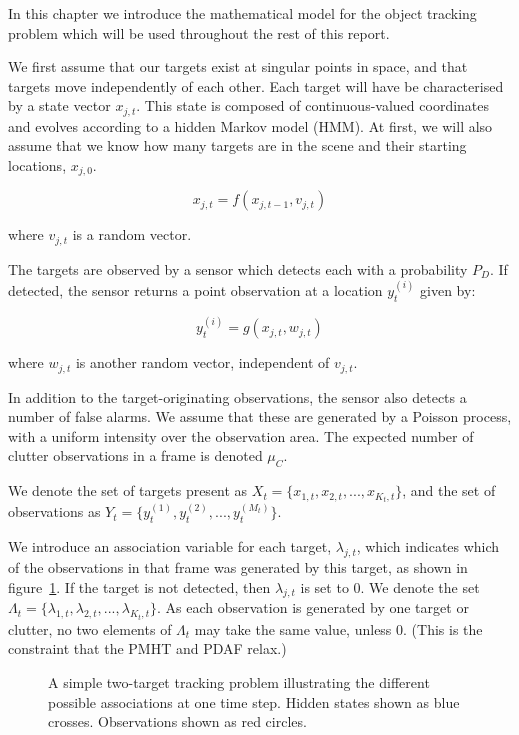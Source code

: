 In this chapter we introduce the mathematical model for the object tracking problem which will be used throughout the rest of this report.

We first assume that our targets exist at singular points in space, and that targets move independently of each other. Each target will have be characterised by a state vector $x_{j,t}$. This state is composed of continuous-valued coordinates and evolves according to a hidden Markov model (HMM). At first, we will also assume that we know how many targets are in the scene and their starting locations, $x_{j,0}$.

\begin{equation}
x_{j,t} = f(x_{j,t-1}, v_{j,t})
\end{equation}

where $v_{j,t}$ is a random vector.

The targets are observed by a sensor which detects each with a probability $P_D$. If detected, the sensor returns a point observation at a location $y_t^{(i)}$ given by:

\begin{equation}
y_t^{(i)} = g(x_{j,t}, w_{j,t})
\end{equation}

where $w_{j,t}$ is another random vector, independent of $v_{j,t}$.

In addition to the target-originating observations, the sensor also detects a number of false alarms. We assume that these are generated by a Poisson process, with a uniform intensity over the observation area. The expected number of clutter observations in a frame is denoted $\mu_C$.

We denote the set of targets present as $X_t = \{x_{1,t}, x_{2,t}, ... , x_{K_t, t} \}$, and the set of observations as $Y_t = \{y_t^{(1)}, y_t^{(2)}, ... , y_t^{(M_t)} \}$.

We introduce an association variable for each target, $\lambda_{j,t}$, which indicates which of the observations in that frame was generated by this target, as shown in figure~\ref{fig:BasicTrackingAssoc}. If the target is not detected, then $\lambda_{j,t}$ is set to 0. We denote the set $\Lambda_t = \{\lambda_{1,t}, \lambda_{2,t}, ... , \lambda_{K_t, t} \}$. As each observation is generated by one target or clutter, no two elements of $\Lambda_t$ may take the same value, unless 0. (This is the constraint that the PMHT and PDAF relax.)

\begin{figure} \centering
%
\caption{A simple two-target tracking problem illustrating the different possible associations at one time step. Hidden states shown as blue crosses. Observations shown as red circles.}
\label{fig:BasicTrackingAssoc}%
\end{figure}

